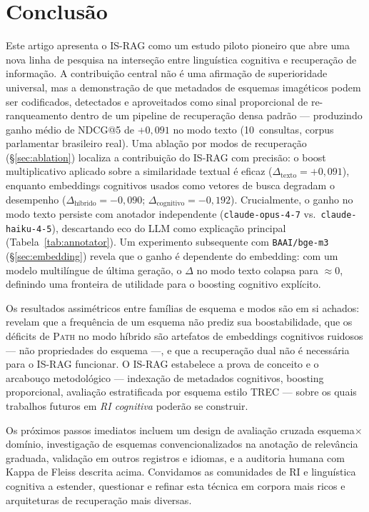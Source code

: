 \documentclass[11pt,a4paper]{article}
\begin{document}
\section{Conclusão}
\label{sec:conclusion}

Este artigo apresenta o IS-RAG como um estudo piloto pioneiro que abre
uma nova linha de pesquisa na interseção entre linguística cognitiva e
recuperação de informação.
A contribuição central não é uma afirmação de superioridade universal,
mas a demonstração de que metadados de esquemas imagéticos podem ser
codificados, detectados e aproveitados como sinal proporcional de
re-ranqueamento dentro de um pipeline de recuperação densa padrão —
produzindo ganho médio de NDCG@5 de $+0{,}091$ no modo texto
(10~consultas, corpus parlamentar brasileiro real).
Uma ablação por modos de recuperação (\S\ref{sec:ablation}) localiza
a contribuição do IS-RAG com precisão: o boost multiplicativo aplicado
sobre a similaridade textual é eficaz
($\Delta_\text{texto} = +0{,}091$), enquanto embeddings cognitivos
usados como vetores de busca degradam o desempenho
($\Delta_\text{híbrido} = -0{,}090$;
$\Delta_\text{cognitivo} = -0{,}192$).
Crucialmente, o ganho no modo texto persiste com anotador independente
(\texttt{claude-opus-4-7} vs.\ \texttt{claude-haiku-4-5}),
descartando eco do LLM como explicação principal
(Tabela~\ref{tab:annotator}).
Um experimento subsequente com \texttt{BAAI/bge-m3}
(\S\ref{sec:embedding}) revela que o ganho é dependente do embedding:
com um modelo multilíngue de última geração, o $\Delta$ no modo texto
colapsa para $\approx 0$, definindo uma fronteira de utilidade para o
boosting cognitivo explícito.

Os resultados assimétricos entre famílias de esquema e modos são em si
achados: revelam que a frequência de um esquema não prediz sua
boostabilidade, que os déficits de \textsc{Path} no modo híbrido são
artefatos de embeddings cognitivos ruidosos — não propriedades do
esquema —, e que a recuperação dual não é necessária para o IS-RAG
funcionar.
O IS-RAG estabelece a prova de conceito e o arcabouço metodológico —
indexação de metadados cognitivos, boosting proporcional, avaliação
estratificada por esquema estilo TREC — sobre os quais trabalhos futuros
em \emph{RI cognitiva} poderão se construir.

Os próximos passos imediatos incluem um design de avaliação cruzada
esquema$\times$domínio, investigação de esquemas convencionalizados
na anotação de relevância graduada, validação em outros registros e
idiomas, e a auditoria humana com Kappa de Fleiss descrita acima.
Convidamos as comunidades de RI e linguística cognitiva a estender,
questionar e refinar esta técnica em corpora mais ricos e arquiteturas
de recuperação mais diversas.
\end{document}
